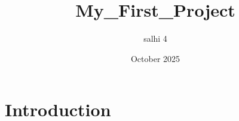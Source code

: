 \documentclass{article}
\title{My_First_Project}
\author{salhi 4}
\date{October 2025}
\begin{document}
\maketitle

\section{Introduction}
\end{document}
